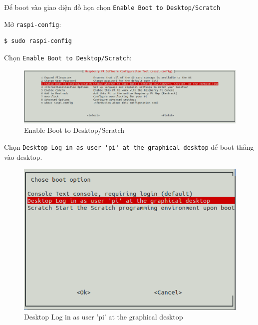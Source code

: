 \documentclass[12pt,a4paper]{article}
\begin{document}
	Để boot vào giao diện đồ họa chọn \verb|Enable Boot to Desktop/Scratch|
	\begin{list}{--}{}
		\item Mở \verb|raspi-config|:
		\begin{lstlisting}[language=bash]
$ sudo raspi-config
		\end{lstlisting}

		\item Chọn \verb|Enable Boot to Desktop/Scratch|:
			\begin{figure}[!h]
				\begin{center}
					\includegraphics[scale=.35]{Enable-Boot-to-Desktop-Scratch.png}
				\end{center}
				\caption{Enable Boot to Desktop/Scratch}
			\end{figure}
			
		\item Chọn \verb|Desktop Log in as user 'pi' at the graphical desktop| để boot thẳng vào desktop.
		\begin{figure}[!h]
			\begin{center}
				\includegraphics[scale=.35]{desktop.png} 
			\end{center}
			\caption{Desktop Log in as user 'pi' at the graphical desktop}
		\end{figure}
	\end{list}
	
\end{document}
